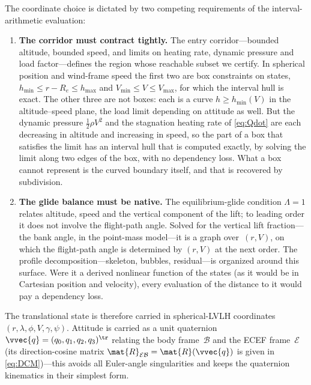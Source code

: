 The coordinate choice is dictated by two competing requirements of the
interval-arithmetic evaluation:
\begin{enumerate}
  \item \textbf{The corridor must contract tightly.} The entry
    corridor---bounded altitude, bounded speed, and limits on heating
    rate, dynamic pressure and load factor---defines the region whose
    reachable subset we certify. In spherical position and wind-frame
    speed the first two are box constraints on states,
    $h_{\min}\le r - R_e \le h_{\max}$ and $V_{\min}\le V\le V_{\max}$, for
    which the interval hull is exact. The other three are not boxes: each
    is a curve $h \ge h_{\min}(V)$ in the altitude--speed plane, the load
    limit depending on attitude as well. But the dynamic pressure
    $\tfrac12\rho V^2$ and the stagnation heating rate of \cref{eq:Qdot}
    are each decreasing in altitude and increasing in speed, so the part of
    a box that satisfies the limit has an interval hull that is computed
    exactly, by solving the limit along two edges of the box, with no
    dependency loss. What a box cannot represent is the curved boundary
    itself, and that is recovered by subdivision.

  \item \textbf{The glide balance must be native.} The equilibrium-glide
    condition $\Lambda = 1$ relates altitude, speed and the vertical
    component of the lift; to leading order it does not involve the
    flight-path angle. Solved for the vertical lift fraction---the bank
    angle, in the point-mass model---it is a graph over~$(r,V)$, on which
    the flight-path angle is determined by $(r,V)$ at the next order. The
    profile decomposition---skeleton, bubbles, residual---is organized
    around this surface. Were it a derived nonlinear function of the states
    (as it would be in Cartesian position and velocity), every evaluation
    of the distance to it would pay a dependency loss.
\end{enumerate}

The translational state is therefore carried in spherical-LVLH coordinates
$(r,\lambda,\phi,V,\gamma,\psi)$. Attitude is carried as a unit quaternion
$\vvec{q} = (q_0,q_1,q_2,q_3)^\tr$ relating the body frame~$\mathcal{B}$ and
the ECEF frame~$\mathcal{E}$ (its direction-cosine matrix
$\mat{R}_{\mathcal{E}\mathcal{B}} = \mat{R}(\vvec{q})$ is given in
\cref{eq:DCM})---this avoids all Euler-angle singularities and keeps the
quaternion kinematics in their simplest form.

